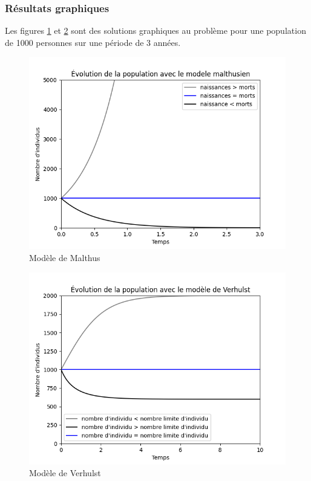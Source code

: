 \documentclass{article}
\begin{document}
\subsubsection{Résultats graphiques}
Les figures  \ref{fig:malthus} et \ref{fig:verhulst} sont des solutions graphiques au problème pour une population de 1000 personnes sur une période de 3 années.
\begin{multicols}{2}

\begin{figure}[H]
\captionsetup{justification=centering}
      \includegraphics[scale=0.5]{malthusien.png}
      \caption{Modèle de Malthus}
      \label{fig:malthus}
 \end{figure}     
    
    \columnbreak

\begin{figure}[H]
\captionsetup{justification=centering}
      \includegraphics[scale=0.5]{verhulst.png}
      \caption{Modèle de Verhulst}
      \label{fig:verhulst}
\end{figure}

\end{multicols}
\end{document}
